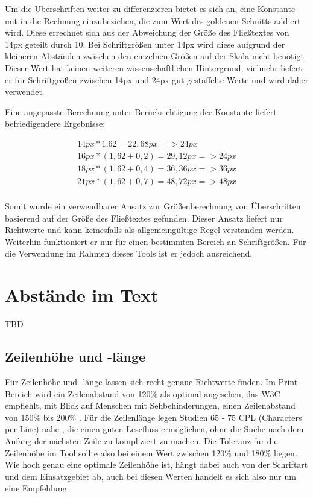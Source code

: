 Um die Überschriften weiter zu differenzieren bietet es sich an, eine Konstante mit in die Rechnung einzubeziehen, die zum Wert des goldenen Schnitts addiert wird. Diese errechnet sich aus der Abweichung der Größe des Fließtextes von 14px geteilt durch 10. Bei Schriftgrößen unter 14px wird diese aufgrund der kleineren Abständen zwischen den einzelnen Größen auf der Skala nicht benötigt.
Dieser Wert hat keinen weiteren wissenschaftlichen Hintergrund, vielmehr liefert er für Schriftgrößen zwischen 14px und 24px gut gestaffelte Werte und wird daher verwendet.

Eine angepasste Berechnung unter Berücksichtigung der Konstante liefert befriedigendere Ergebnisse:

\begin{equation}
\begin{split}
14px * 1.62 = 22,68px => 24px \\
16px * (1,62 + 0,2) = 29,12px => 24px \\
18px * (1,62 + 0,4) = 36,36px => 36px \\
21px * (1,62 + 0,7) = 48,72px => 48px \\
\end{split}
\end{equation}


Somit wurde ein verwendbarer Ansatz zur Größenberechnung von Überschriften basierend auf der Größe des Fließtextes gefunden. Dieser Ansatz liefert nur Richtwerte und kann keinesfalls als allgemeingültige Regel verstanden werden. Weiterhin funktioniert er nur für einen bestimmten Bereich an Schriftgrößen. Für die Verwendung  im Rahmen dieses Tools ist er jedoch ausreichend.



\section{Abstände im Text}
TBD

\subsection{Zeilenhöhe und -länge}
Für Zeilenhöhe und -länge lassen sich recht genaue Richtwerte finden. Im Print-Bereich wird ein Zeilenabstand von 120\% \cite[S. 150]{Runk200804} als optimal angesehen, das W3C empfiehlt, mit Blick auf Menschen mit Sehbehinderungen, einen Zeilenabstand von 150\% bis 200\% \cite{W3C}. Für die Zeilenlänge legen Studien 65 - 75 CPL (Characters per Line) nahe \cite{bernard2002effects}, die einen guten Lesefluss ermöglichen, ohne die Suche nach dem Anfang der nächsten Zeile zu kompliziert zu machen.
Die Toleranz für die Zeilenhöhe im Tool sollte also bei einem Wert zwischen 120\% und 180\% liegen. Wie hoch genau eine optimale Zeilenhöhe ist, hängt dabei auch von der Schriftart und dem Einsatzgebiet ab, auch bei diesen Werten handelt es sich also nur um eine Empfehlung.

